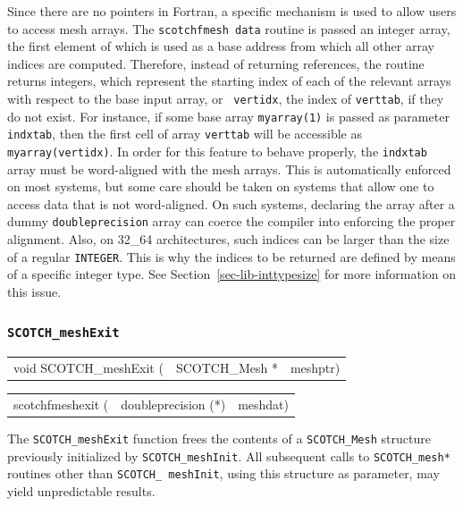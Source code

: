 \begin{itemize}
Since there are no pointers in Fortran, a specific mechanism is used
to allow users to access mesh arrays. The {\tt scotchf\lbt mesh\lbt
data} routine is passed an integer array, the first element of which is used
as a base address from which all other array indices are
computed. Therefore, instead of returning references, the routine
returns integers, which represent the starting index of each of the
relevant arrays with respect to the base input array, or {\tt
vertidx}, the index of {\tt verttab}, if they do not exist. For
instance, if some base array {\tt myarray\lbt (1)} is passed as
parameter {\tt indxtab}, then the first cell of array {\tt verttab}
will be accessible as {\tt myarray\lbt (vertidx)}.
In order for this feature to behave properly, the {\tt indxtab}
array must be word-aligned with the mesh arrays. This is
automatically enforced on most systems, but some care should be
taken on systems that allow one to access data that is not
word-aligned. On such systems, declaring the array after a
dummy {\tt double\lbt precision} array can coerce the compiler
into enforcing the proper alignment. Also, on 32\_64 architectures,
such indices can be larger than the size of a regular
{\tt INTEGER}. This is why the indices to be returned are defined by
means of a specific integer type. See
Section~\ref{sec-lib-inttypesize} for more information on this
issue.
\end{itemize}

\subsubsection{{\tt SCOTCH\_meshExit}}

\begin{itemize}
\progsyn

{\tt\begin{tabular}{l@{}ll}
void SCOTCH\_meshExit ( & SCOTCH\_Mesh * & meshptr)
\end{tabular}}

{\tt\begin{tabular}{l@{}ll}
scotchfmeshexit ( & doubleprecision (*) & meshdat)
\end{tabular}}

\progdes

The {\tt SCOTCH\_meshExit} function frees the contents of a
{\tt SCOTCH\_\lbt Mesh} structure previously initialized by
{\tt SCOTCH\_\lbt meshInit}. All subsequent calls to
{\tt SCOTCH\_\lbt mesh*} routines other than {\tt SCOTCH\_\lbt
meshInit}, using this structure as parameter, may yield
unpredictable results.
\end{itemize}

